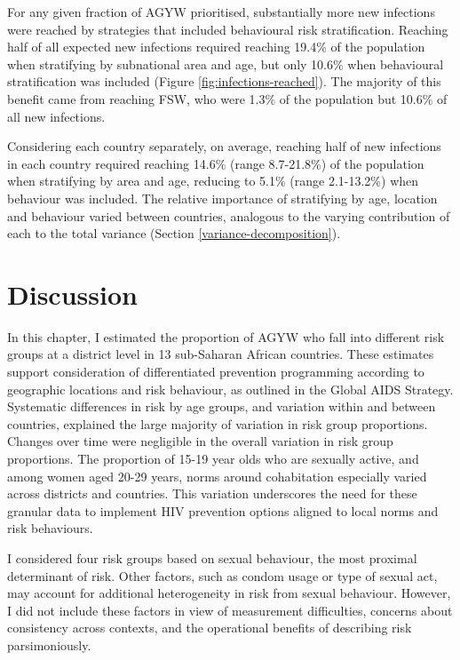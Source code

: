 \documentclass[a4paper, nobind]{templates/ociamthesis}
\begin{document}
For any given fraction of AGYW prioritised, substantially more new infections were reached by strategies that included behavioural risk stratification.
Reaching half of all expected new infections required reaching 19.4\% of the population when stratifying by subnational area and age, but only 10.6\% when behavioural stratification was included (Figure \ref{fig:infections-reached}).
The majority of this benefit came from reaching FSW, who were 1.3\% of the population but 10.6\% of all new infections.

Considering each country separately, on average, reaching half of new infections in each country required reaching 14.6\% (range 8.7-21.8\%) of the population when stratifying by area and age, reducing to 5.1\% (range 2.1-13.2\%) when behaviour was included.
The relative importance of stratifying by age, location and behaviour varied between countries, analogous to the varying contribution of each to the total variance (Section \ref{variance-decomposition}).

\hypertarget{discussion-1}{%
\section{Discussion}\label{discussion-1}}

In this chapter, I estimated the proportion of AGYW who fall into different risk groups at a district level in 13 sub-Saharan African countries.
These estimates support consideration of differentiated prevention programming according to geographic locations and risk behaviour, as outlined in the Global AIDS Strategy.
Systematic differences in risk by age groups, and variation within and between countries, explained the large majority of variation in risk group proportions.
Changes over time were negligible in the overall variation in risk group proportions.
The proportion of 15-19 year olds who are sexually active, and among women aged 20-29 years, norms around cohabitation especially varied across districts and countries.
This variation underscores the need for these granular data to implement HIV prevention options aligned to local norms and risk behaviours.

I considered four risk groups based on sexual behaviour, the most proximal determinant of risk.
Other factors, such as condom usage or type of sexual act, may account for additional heterogeneity in risk from sexual behaviour.
However, I did not include these factors in view of measurement difficulties, concerns about consistency across contexts, and the operational benefits of describing risk parsimoniously.
\end{document}
